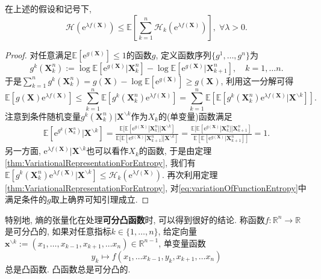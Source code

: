 \begin{lemma}[熵的张量化]\label{lemma:EntropyTensorization}
	在上述的假设和记号下, 
	\begin{equation*}
		\mathcal{H}(\mathrm{e}^{\lambda f(\bm{X})})
		\leq \mathbb{E}\left[ \sum_{k=1}^n \mathcal{H}_k (\mathrm{e}^{\lambda f(\bm{X})}) \right],\; 
		\forall \lambda > 0. 
	\end{equation*}
\end{lemma}
\begin{proof}
	对任意满足$\mathbb{E}[\mathrm{e}^{g(\bm{X})}] \leq 1$的函数$g$, 定义函数序列$\{g^1, \dots, g^n\}$为
	\begin{equation*}
		g^k(\bm{X}_k^n):= \log \mathbb{E}[\mathrm{e}^{g(\bm{X})} | \bm{X}_k^n] - \log \mathbb{E}[\mathrm{e}^{g(\bm{X})} | \bm{X}_{k+1}^n],\quad k = 1, \dots n. 
	\end{equation*}
	于是$\sum_{k=1}^n g^k(\bm{X}_k^n) = g(\bm{X}) - \log \mathbb{E}[ \mathrm{e}^{g(\bm{X})} ] \geq g(\bm{X})$, 利用这一分解可得
	\begin{equation}\label{eq:variationOfFunctionEntropy}
		\mathbb{E}[ g(\bm{X}) \mathrm{e}^{\lambda f(\bm{X})}]
		\leq \sum_{k=1}^n \mathbb{E}[ g^k(\bm{X}_k^n) \mathrm{e}^{\lambda f(\bm{X})} ] 
		= \sum_{k=1}^n \mathbb{E}\left[ \mathbb{E}[ g^k(\bm{X}_k^n) \mathrm{e}^{\lambda f(\bm{X})} | \bm{X}^{\backslash k} ] \right]. 
	\end{equation}
	注意到条件随机变量$g^k(\bm{X}_k^n)|\bm{X}^{\backslash k}$作为$X_k$的(单变量)函数满足
	\begin{align*}
		\mathbb{E}[\mathrm{e}^{g^k(\bm{X}_k^n)}| \bm{X}^{\backslash k}]
		= \frac{\mathbb{E}[\mathbb{E}[\mathrm{e}^{g(\bm{X})} | \bm{X}_k^n]|\bm{X}^{\backslash k}]}{\mathbb{E}[\mathbb{E}[\mathrm{e}^{g(\bm{X})} | \bm{X}_{k+1}^n]|\bm{X}^{\backslash k}]}
		= \frac{\mathbb{E}[\mathbb{E}[\mathrm{e}^{g(\bm{X})} | \bm{X}_k^n]|\bm{X}_{k+1}^n]}{\mathbb{E}[\mathbb{E}[\mathrm{e}^{g(\bm{X})} | \bm{X}_{k+1}^n]]}
		= 1. 
	\end{align*}
	另一方面, $\mathrm{e}^{\lambda f(\bm{X})} | \bm{X}^{\backslash k}$也可以看作$X_k$的函数, 于是由定理\ref{thm:VariationalRepresentationForEntropy}, 我们有
	$\mathbb{E}[ g^k(\bm{X}_k^n) \mathrm{e}^{\lambda f(\bm{X})} | \bm{X}^{\backslash k} ] \leq \mathcal{H}_k(\mathrm{e}^{\lambda f(\bm{X})})$. 
	再次利用定理\ref{thm:VariationalRepresentationForEntropy}, 对\eqref{eq:variationOfFunctionEntropy}中满足条件的$g$取上确界可知引理成立. 
\end{proof}

特别地, 熵的张量化在处理\textbf{可分凸函数}时, 可以得到很好的结论. 
称函数$f \colon \mathbb{R}^n \to \mathbb{R}$是可分凸的, 如果对任意指标$k \in \{1, \dots, n\}$, 给定向量$\bm{x}^{\backslash k} := (x_1, \dots, x_{k-1}, x_{k+1}, \dots x_n) \in \mathbb{R}^{n-1}$, 单变量函数
\begin{equation*}
	y_k \mapsto f(x_1, \dots x_{k-1}, y_k, x_{k+1}, \dots x_n)
\end{equation*}
总是凸函数. 
凸函数总是可分凸的. 

